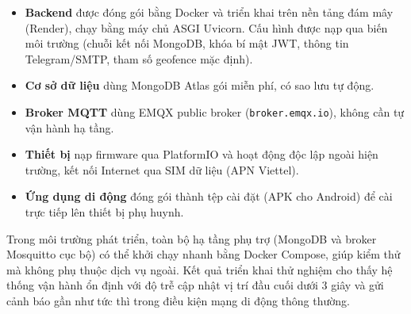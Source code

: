 \documentclass[../DoAn.tex]{subfiles}
\begin{document}
    \begin{itemize}
        \item \textbf{Backend} được đóng gói bằng Docker và triển khai trên nền tảng đám mây (Render), chạy bằng máy chủ ASGI Uvicorn. Cấu hình được nạp qua biến môi trường (chuỗi kết nối MongoDB, khóa bí mật JWT, thông tin Telegram/SMTP, tham số geofence mặc định).
        \item \textbf{Cơ sở dữ liệu} dùng MongoDB Atlas gói miễn phí, có sao lưu tự động.
        \item \textbf{Broker MQTT} dùng EMQX public broker (\texttt{broker.emqx.io}), không cần tự vận hành hạ tầng.
        \item \textbf{Thiết bị} nạp firmware qua PlatformIO và hoạt động độc lập ngoài hiện trường, kết nối Internet qua SIM dữ liệu (APN Viettel).
        \item \textbf{Ứng dụng di động} đóng gói thành tệp cài đặt (APK cho Android) để cài trực tiếp lên thiết bị phụ huynh.
    \end{itemize}

    Trong môi trường phát triển, toàn bộ hạ tầng phụ trợ (MongoDB và broker Mosquitto cục bộ) có thể khởi chạy nhanh bằng Docker Compose, giúp kiểm thử mà không phụ thuộc dịch vụ ngoài. Kết quả triển khai thử nghiệm cho thấy hệ thống vận hành ổn định với độ trễ cập nhật vị trí đầu cuối dưới 3 giây và gửi cảnh báo gần như tức thì trong điều kiện mạng di động thông thường.

    
\end{document}
